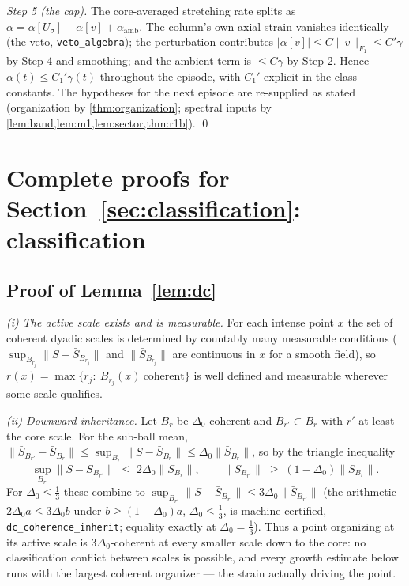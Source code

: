\documentclass[11pt,letterpaper]{amsart}
\theoremstyle{definition}
\theoremstyle{remark}
\newcommand{\norm}[1]{\lVert #1 \rVert}
\newcommand{\abs}[1]{\lvert #1 \rvert}
\begin{document}
\emph{Step 5 (the cap).} The core-averaged stretching rate splits as
$\alpha=\alpha[U_\sigma]+\alpha[v]+\alpha_{\mathrm{amb}}$. The column's own axial
strain vanishes identically (the veto, \texttt{veto\_algebra}); the perturbation
contributes $\abs{\alpha[v]}\le C\norm{v}_{F_1}\le C'\gamma$ by Step 4 and smoothing;
and the ambient term is $\le C\gamma$ by Step 2. Hence $\alpha(t)\le C_1'\gamma(t)$
throughout the episode, with $C_1'$ explicit in the class constants. The hypotheses
for the next episode are re-supplied as stated (organization by
\cref{thm:organization}; spectral inputs by
\cref{lem:band,lem:m1,lem:sector,thm:r1b}). \qed


\section{Complete proofs for Section~\ref{sec:classification}: classification}\label{pfsec:classification}

\subsection{Proof of Lemma~\ref{lem:dc}}\label{pf:dc}
\emph{(i) The active scale exists and is measurable.} For each intense point $x$ the
set of coherent dyadic scales is determined by countably many measurable conditions
($\sup_{B_{r_j}}\norm{S-\bar S_{B_{r_j}}}$ and $\norm{\bar S_{B_{r_j}}}$ are
continuous in $x$ for a smooth field), so
$r(x)=\max\{r_j:\ B_{r_j}(x)\ \text{coherent}\}$ is well defined and measurable
wherever some scale qualifies.

\emph{(ii) Downward inheritance.} Let $B_r$ be $\Delta_0$-coherent and
$B_{r'}\subset B_r$ with $r'$ at least the core scale. For the sub-ball mean,
$\norm{\bar S_{B_{r'}}-\bar S_{B_r}}\le\sup_{B_r}\norm{S-\bar S_{B_r}}
\le\Delta_0\norm{\bar S_{B_r}}$, so by the triangle inequality
\[
\sup_{B_{r'}}\norm{S-\bar S_{B_{r'}}}\;\le\;2\Delta_0\norm{\bar S_{B_r}},
\qquad
\norm{\bar S_{B_{r'}}}\;\ge\;(1-\Delta_0)\norm{\bar S_{B_r}} .
\]
For $\Delta_0\le\tfrac13$ these combine to
$\sup_{B_{r'}}\norm{S-\bar S_{B_{r'}}}\le3\Delta_0\norm{\bar S_{B_{r'}}}$
(the arithmetic $2\Delta_0 a\le3\Delta_0 b$ under $b\ge(1-\Delta_0)a$,
$\Delta_0\le\tfrac13$, is machine-certified, \texttt{dc\_coherence\_inherit};
equality exactly at $\Delta_0=\tfrac13$). Thus a point organizing at its active scale
is $3\Delta_0$-coherent at every smaller scale down to the core: no classification
conflict between scales is possible, and every growth estimate below runs with the
largest coherent organizer --- the strain actually driving the point.
\end{document}
